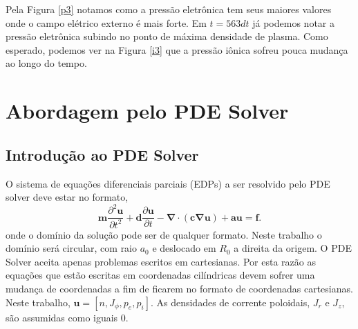 \documentclass[12pt,oneside,a4paper]{abntex2}
\begin{document}
 Pela Figura \ref{p3} notamos como a pressão eletrônica tem seus maiores valores onde o campo elétrico externo é mais forte. Em $t=563dt$ já podemos notar a pressão eletrônica subindo no ponto de máxima densidade de plasma. 
Como esperado, podemos ver na Figura \ref{i3} que a pressão iônica sofreu pouca mudança ao longo do tempo.

\section{Abordagem pelo PDE Solver}

\subsection{Introdução ao PDE Solver}
\noindent O sistema de equações diferenciais parciais (EDPs) a ser resolvido pelo PDE solver deve estar no formato, 
\begin{equation}
\bm{m} \frac{\partial^2 \bm{u}}{\partial t^2} + \bm{d} \frac{\partial \bm{u}}{\partial t} - \bm{\nabla} \cdot \left( \bm{c} \bm{\nabla} \bm{u} \right) + \bm{a}\bm{u} = \bm{f}.
\label{sistemapde}
\end{equation} 
onde o domínio da solução pode ser de qualquer formato. Neste trabalho o domínio será circular, com raio $a_0$ e deslocado em $R_0$ a direita da origem. O PDE Solver aceita apenas problemas escritos em cartesianas. Por esta razão as equações que estão escritas em coordenadas cilíndricas devem sofrer uma mudança de coordenadas a fim de ficarem no formato de coordenadas cartesianas.
Neste trabalho, $\bm{u}=[n, J_\phi, p_e, p_i]$. As densidades de corrente poloidais, $J_r$ e $J_z$, são assumidas como iguais 0.
\end{document}
